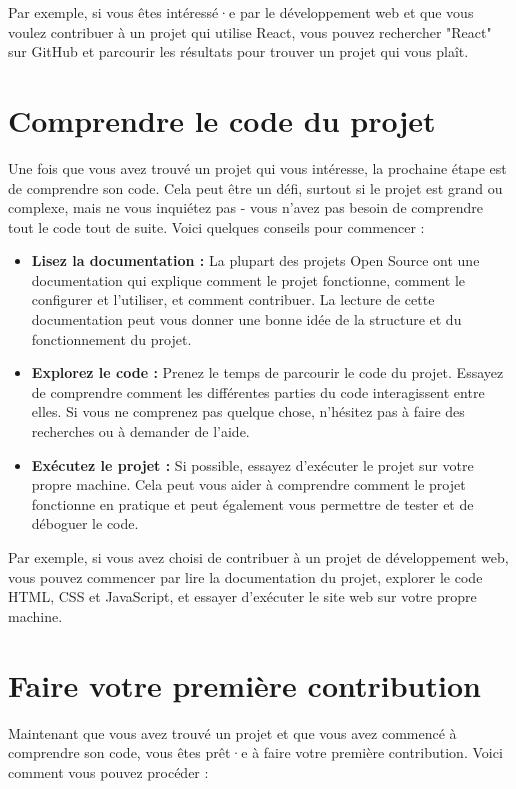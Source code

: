 Par exemple, si vous êtes intéressé·e par le développement web et que vous voulez contribuer à un projet qui utilise React, vous pouvez rechercher "React" sur GitHub et parcourir les résultats pour trouver un projet qui vous plaît.

\section{Comprendre le code du projet}

Une fois que vous avez trouvé un projet qui vous intéresse, la prochaine étape est de comprendre son code. Cela peut être un défi, surtout si le projet est grand ou complexe, mais ne vous inquiétez pas - vous n'avez pas besoin de comprendre tout le code tout de suite. Voici quelques conseils pour commencer :

\begin{itemize}
    \item \textbf{Lisez la documentation :} La plupart des projets Open Source ont une documentation qui explique comment le projet fonctionne, comment le configurer et l'utiliser, et comment contribuer. La lecture de cette documentation peut vous donner une bonne idée de la structure et du fonctionnement du projet.
    \item \textbf{Explorez le code :} Prenez le temps de parcourir le code du projet. Essayez de comprendre comment les différentes parties du code interagissent entre elles. Si vous ne comprenez pas quelque chose, n'hésitez pas à faire des recherches ou à demander de l'aide.
    \item \textbf{Exécutez le projet :} Si possible, essayez d'exécuter le projet sur votre propre machine. Cela peut vous aider à comprendre comment le projet fonctionne en pratique et peut également vous permettre de tester et de déboguer le code.
\end{itemize}

Par exemple, si vous avez choisi de contribuer à un projet de développement web, vous pouvez commencer par lire la documentation du projet, explorer le code HTML, CSS et JavaScript, et essayer d'exécuter le site web sur votre propre machine.

\section{Faire votre première contribution}

Maintenant que vous avez trouvé un projet et que vous avez commencé à comprendre son code, vous êtes prêt·e à faire votre première contribution. Voici comment vous pouvez procéder :

